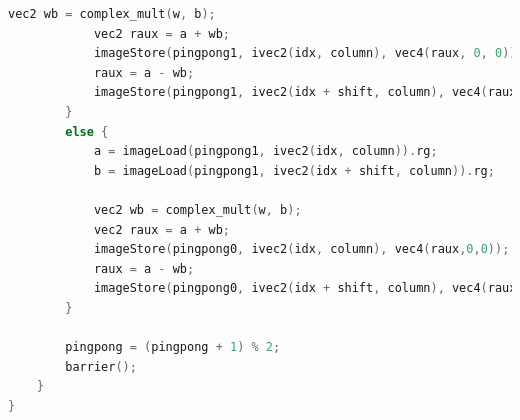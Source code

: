 \documentclass[
  oneside,
  11pt, a4paper,
  footinclude=true,
  headinclude=true,
  cleardoublepage=empty
]{scrbook}
\begin{document}
\begin{lstlisting}[language=C,caption={FFT Radix-2 Cooley-Tukey Horizontal unique pass, see \autoref{subsec:all-stages-in-one-pass}},label={lst:glsl-radix2-ct-unique-horizontal}]
            vec2 wb = complex_mult(w, b);
            vec2 raux = a + wb;
            imageStore(pingpong1, ivec2(idx, column), vec4(raux, 0, 0));
            raux = a - wb;
            imageStore(pingpong1, ivec2(idx + shift, column), vec4(raux, 0, 0));
        }
        else {
            a = imageLoad(pingpong1, ivec2(idx, column)).rg;
            b = imageLoad(pingpong1, ivec2(idx + shift, column)).rg;

            vec2 wb = complex_mult(w, b);
            vec2 raux = a + wb;
            imageStore(pingpong0, ivec2(idx, column), vec4(raux,0,0));
            raux = a - wb;
            imageStore(pingpong0, ivec2(idx + shift, column), vec4(raux,0,0));
        }

        pingpong = (pingpong + 1) % 2;
        barrier();
    }
}
\end{lstlisting}
\end{document}
